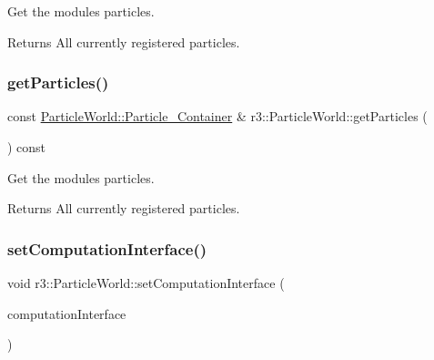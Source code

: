 Get the module\textquotesingle{}s particles. 

\begin{DoxyReturn}{Returns}
All currently registered particles. 
\end{DoxyReturn}
\mbox{\label{classr3_1_1_particle_world_ab816d6bca8b42fdf16170275087008f0}} 
\subsubsection{\texorpdfstring{get\+Particles()}{getParticles()}\hspace{0.1cm}{\footnotesize\ttfamily [2/2]}}
{\footnotesize\ttfamily const \mbox{\hyperlink{classr3_1_1_particle_world_aa354f6786c0837674fe8286f00465631}{Particle\+World\+::\+Particle\+\_\+\+Container}} \& r3\+::\+Particle\+World\+::get\+Particles (\begin{DoxyParamCaption}{ }\end{DoxyParamCaption}) const}



Get the module\textquotesingle{}s particles. 

\begin{DoxyReturn}{Returns}
All currently registered particles. 
\end{DoxyReturn}
\mbox{\label{classr3_1_1_particle_world_adf5630d53659e9ced254d33990f15a9d}} 
\subsubsection{\texorpdfstring{set\+Computation\+Interface()}{setComputationInterface()}}
{\footnotesize\ttfamily void r3\+::\+Particle\+World\+::set\+Computation\+Interface (\begin{DoxyParamCaption}\item[{\mbox{\hyperlink{classr3_1_1_particle_engine_c_i}{Particle\+Engine\+CI}} $\ast$}]{computation\+Interface }\end{DoxyParamCaption})}



